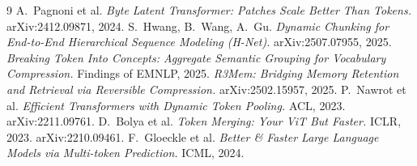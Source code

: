\documentclass[11pt]{article}
\begin{document}
\begin{thebibliography}{9}
\small
{} A.~Pagnoni et al. \emph{Byte Latent Transformer: Patches Scale Better Than Tokens.} arXiv:2412.09871, 2024.
 S.~Hwang, B.~Wang, A.~Gu. \emph{Dynamic Chunking for End-to-End Hierarchical Sequence Modeling (H-Net).} arXiv:2507.07955, 2025.
 \emph{Breaking Token Into Concepts: Aggregate Semantic Grouping for Vocabulary Compression.} Findings of EMNLP, 2025.
 \emph{R3Mem: Bridging Memory Retention and Retrieval via Reversible Compression.} arXiv:2502.15957, 2025.
 P.~Nawrot et al. \emph{Efficient Transformers with Dynamic Token Pooling.} ACL, 2023. arXiv:2211.09761.
 D.~Bolya et al. \emph{Token Merging: Your ViT But Faster.} ICLR, 2023. arXiv:2210.09461.
 F.~Gloeckle et al. \emph{Better \& Faster Large Language Models via Multi-token Prediction.} ICML, 2024.
\end{thebibliography}
\end{document}
